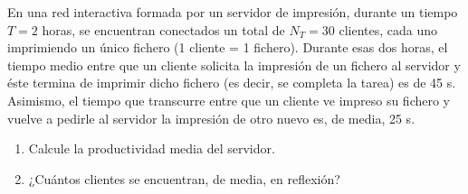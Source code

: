 \begin{ejercicio}\label{ej:5.31}
    En una red interactiva formada por un servidor de impresión, durante un tiempo $T = 2$ horas, se encuentran conectados un total de $N_T = 30$ clientes, cada uno imprimiendo un único fichero (1 cliente = 1 fichero). Durante esas dos horas, el tiempo medio entre que un cliente solicita la impresión de un fichero al servidor y éste termina de imprimir dicho fichero (es decir, se completa la tarea) es de 45 s. Asimismo, el tiempo que transcurre entre que un cliente ve impreso su fichero y vuelve a pedirle al servidor la impresión de otro nuevo es, de media, 25 s.
    \begin{enumerate}
        \item Calcule la productividad media del servidor.
        \item ¿Cuántos clientes se encuentran, de media, en reflexión?
    \end{enumerate}
\end{ejercicio}
\begin{comment}
\solucion
    \begin{enumerate}
        \item La productividad media del servidor es $X_0 = 0.43$ transacciones/s (nos dan $N_T$, $R_0$ y $Z$). El tiempo $T$ no es necesario para calcular la solución.
        \item El número medio de clientes en reflexión es $N_z = 10.7$ clientes.
    \end{enumerate}
\end{comment}


